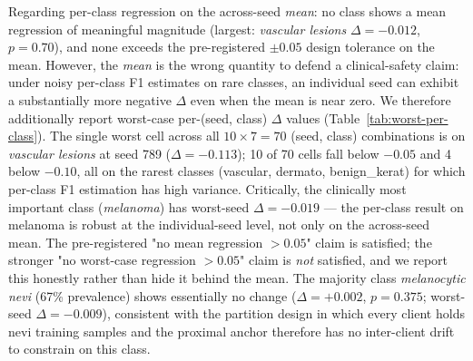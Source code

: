 \documentclass[11pt,a4paper]{article}
\begin{document}
Regarding per-class regression on the across-seed \emph{mean}: no class
shows a mean regression of meaningful magnitude (largest: \textit{vascular
lesions} $\Delta = -0.012$, $p = 0.70$), and none exceeds the
pre-registered $\pm 0.05$ design tolerance on the mean. However, the
\emph{mean} is the wrong quantity to defend a clinical-safety claim:
under noisy per-class F1 estimates on rare classes, an individual seed
can exhibit a substantially more negative $\Delta$ even when the mean is
near zero. We therefore additionally report worst-case per-(seed, class)
$\Delta$ values (Table~\ref{tab:worst-per-class}). The single worst cell
across all $10 \times 7 = 70$ (seed, class) combinations is on
\textit{vascular lesions} at seed 789 ($\Delta = -0.113$); 10 of 70 cells
fall below $-0.05$ and 4 below $-0.10$, all on the rarest classes
(vascular, dermato, benign\_kerat) for which per-class F1 estimation has
high variance. Critically, the clinically most important class
(\textit{melanoma}) has worst-seed $\Delta = -0.019$ --- the per-class
result on melanoma is robust at the individual-seed level, not only on
the across-seed mean. The pre-registered "no mean regression $> 0.05$"
claim is satisfied; the stronger "no worst-case regression $> 0.05$"
claim is \emph{not} satisfied, and we report this honestly rather than
hide it behind the mean. The majority class \textit{melanocytic nevi}
(67\% prevalence) shows essentially no change ($\Delta = +0.002$,
$p = 0.375$; worst-seed $\Delta = -0.009$), consistent with the partition
design in which every client holds nevi training samples and the
proximal anchor therefore has no inter-client drift to constrain on this
class.
\end{document}
